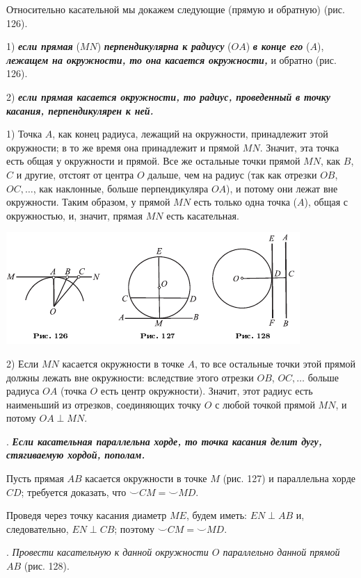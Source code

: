 \documentclass[oneside]{book}
\begin{document}
Относительно касательной мы докажем следующие  (прямую и обратную) (рис. 126).

1) \textbf{\emph{если прямая}} ($MN$) \textbf{\emph{перпендикулярна к радиусу}} ($OA$) \textbf{\emph{в конце его}} ($A$), \textbf{\emph{лежащем на окружности, то она касается окружности,}} и обратно (рис. 126).

2) \textbf{\emph{если прямая касается окружности, то радиус, проведенный в точку касания, перпендикулярен к ней.}}

1) Точка $A$, как конец радиуса, лежащий на окружности, принадлежит этой окружности;
в то же время она принадлежит и прямой $MN$.
Значит, эта точка есть общая у окружности и прямой.
Все же остальные точки прямой $MN$, как $B$, $C$ и другие, отстоят от центра $O$ дальше, чем на радиус (так как отрезки $OB$, $OC,\dots$, как наклонные, больше перпендикуляра $OA$), и потому они лежат вне окружности.
Таким образом, у прямой $MN$ есть только одна точка ($A$), общая с окружностью, и, значит, прямая $MN$ есть касательная.

\includegraphics{pics/ris-126-128}

2) Если $MN$ касается окружности в точке $A$, то все остальные точки этой прямой должны лежать вне окружности:
вследствие этого отрезки $OB$, $OC,\dots$
больше радиуса $OA$ (точка $O$ есть центр окружности).
Значит, этот радиус есть наименьший из отрезков, соединяющих точку $O$ с любой точкой прямой $MN$, и потому $OA\perp MN$.

.
\textbf{\emph{Если касательная параллельна хорде, то точка касания делит дугу, стягиваемую хордой, пополам.}}

Пусть прямая $AB$ касается окружности в точке $M$ (рис. 127) и параллельна хорде $CD$;
требуется доказать, что ${\smallsmile}CM={\smallsmile}MD$.

Проведя через точку касания диаметр $ME$, будем иметь:
$EN\perp AB$ и, следовательно, $EN\perp CB$;
поэтому ${\smallsmile}CM={\smallsmile}MD$.

.
\emph{Провести касательную к данной окружности $O$ параллельно данной прямой $AB$} (рис. 128).
\end{document}
